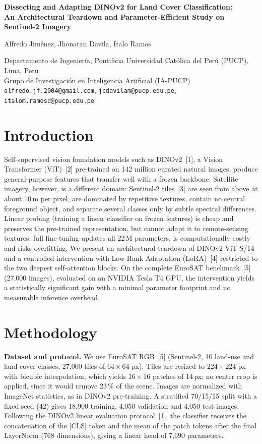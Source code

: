 \documentclass[10pt,a4paper]{article}
\newcommand{\para}[1]{\textbf{#1}\enspace}
\begin{document}
\begin{center}
{\large\bfseries Dissecting and Adapting DINOv2 for Land Cover Classification:\\[1pt]
An Architectural Teardown and Parameter-Efficient Study on Sentinel-2 Imagery\par}
\vspace{0.6em}
{\normalsize Alfredo Jiménez, Jhonatan Davila, Italo Ramos\par}
\vspace{0.2em}
{\small Departamento de Ingeniería, Pontificia Universidad Católica del Perú (PUCP), Lima, Peru\\
Grupo de Investigación en Inteligencia Artificial (IA-PUCP)\\
\texttt{alfredo.jf.2004@gmail.com}, \texttt{jcdavilam@pucp.edu.pe}, \texttt{italom.ramosd@pucp.edu.pe}\par}
\end{center}
\vspace{-0.4em}

\section{Introduction}
Self-supervised vision foundation models such as DINOv2~[1], a Vision Transformer (ViT)~[2] pre-trained on 142 million curated natural images, produce general-purpose features that transfer well with a frozen backbone. Satellite imagery, however, is a different domain: Sentinel-2 tiles~[3] are seen from above at about 10\,m per pixel, are dominated by repetitive textures, contain no central foreground object, and separate several classes only by subtle spectral differences. Linear probing (training a linear classifier on frozen features) is cheap and preserves the pre-trained representation, but cannot adapt it to remote-sensing textures; full fine-tuning updates all 22\,M parameters, is computationally costly and risks overfitting. We present an architectural teardown of DINOv2 ViT-S/14 and a controlled intervention with Low-Rank Adaptation (LoRA)~[4] restricted to the two deepest self-attention blocks. On the complete EuroSAT benchmark~[5] (27,000 images), evaluated on an NVIDIA Tesla T4 GPU, the intervention yields a statistically significant gain with a minimal parameter footprint and no measurable inference overhead.

\section{Methodology}
\para{Dataset and protocol.} We use EuroSAT RGB~[5] (Sentinel-2, 10 land-use and land-cover classes, 27,000 tiles of $64\times64$ px). Tiles are resized to $224\times224$ px with bicubic interpolation, which yields $16\times16$ patches of 14\,px; no center crop is applied, since it would remove 23\,\% of the scene. Images are normalized with ImageNet statistics, as in DINOv2 pre-training. A stratified 70/15/15 split with a fixed seed (42) gives 18,900 training, 4,050 validation and 4,050 test images. Following the DINOv2 linear evaluation protocol~[1], the classifier receives the concatenation of the [CLS] token and the mean of the patch tokens after the final LayerNorm (768 dimensions), giving a linear head of 7,690 parameters.
\end{document}
